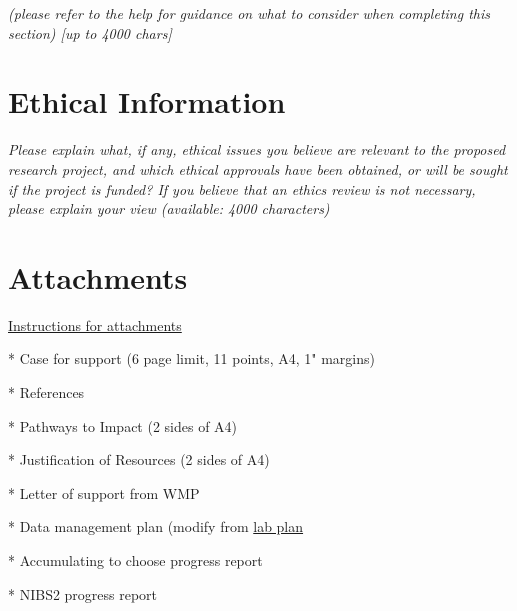 \documentclass[11pt, a4paper]{article}
\begin{document}
\textit{(please refer to the help for guidance on what to consider when completing this section) [up to 4000 chars]}

\section{Ethical Information}

\textit{Please explain what, if any, ethical issues you believe are relevant to the proposed research project, and which ethical approvals have been obtained, or will be sought if the project is funded? If you believe that an ethics review is not necessary, please explain your view (available: 4000 characters)}


\section{Attachments}

\href{https://je-s.rcuk.ac.uk/Handbook/Index.htm#pages/GuidanceonCompletingaStandardG/CaseforSupportandAttachments/ESRCSpecificRequirements.htm}{Instructions for attachments}

* Case for support (6 page limit, 11 points, A4, 1" margins) 

* References

* Pathways to Impact (2 sides of A4) 

* Justification of Resources (2 sides of A4)

* Letter of support from WMP

* Data management plan (modify from \href{https://github.com/neil-stewart/data_management_plan}{lab plan}


* Accumulating to choose progress report

* NIBS2 progress report



\newpage



\end{document}
